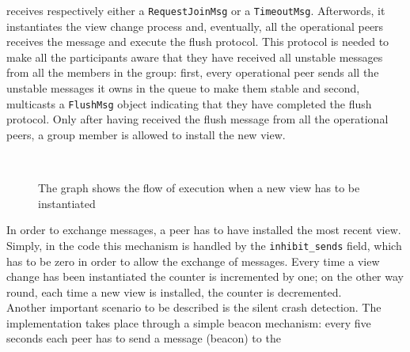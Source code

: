 \documentclass[conference]{IEEEtran}
\begin{document}
receives respectively either a \texttt{RequestJoinMsg} or a \texttt{TimeoutMsg}.
Afterwords, it instantiates the view change process and,
eventually, all the operational peers receives the message and execute
the flush protocol. This protocol is needed to make all the participants
aware that they have received all unstable messages from all the 
members in the group: first, every operational peer sends all the 
unstable messages it owns in the queue to make them stable and second, 
multicasts a \texttt{FlushMsg} object indicating that they have 
completed the flush protocol. 
Only after having received the flush message from all the operational peers, a 
group member is allowed to install the new view. \\
\begin{figure}[ht]%
	\centering
	\\%
	\caption{The graph shows the flow of execution when a new view has
	to be instantiated}%
	\label{fig:NewView}%
\end{figure}
In order to exchange messages, a peer has to have installed the most 
recent view. Simply, in the code this mechanism is handled by the
\texttt{inhibit\_sends} field, which has to be zero in order to allow 
the exchange of messages. Every time a view change has been instantiated
the counter is incremented by one; on the other way round, each time 
a new view is installed, the counter is decremented. \\
Another important scenario to be described is the silent crash detection. 
The implementation takes place through a simple beacon mechanism:
every five seconds each peer has to send a message (beacon) to the 
\end{document}
